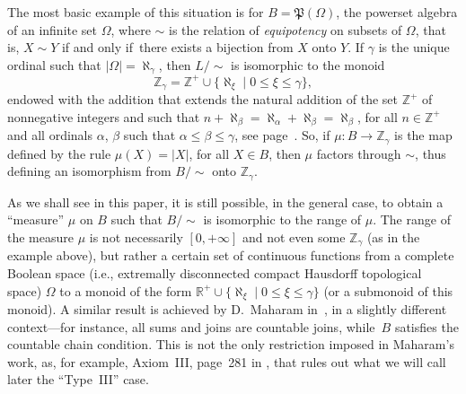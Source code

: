 \documentclass[psamsfonts,reqno]{memo-l}
\theoremstyle{plain}
\theoremstyle{definition}
\theoremstyle{remark}
\numberwithin{equation}{section}
\renewcommand{\iff}{if and only if}
\newcommand{\ZZ}{\mathbb{Z}}
\newcommand{\RR}{\mathbb{R}}
\newcommand{\set}[1]{\{#1\}}
\newcommand{\setm}[2]{\set{#1\mid#2}}
\begin{document}
The most basic example of this situation is for
$B=\mathfrak{P}(\Omega)$, the powerset algebra of an infinite set $\Omega$,
where $\sim$ is the relation of \emph{equipotency}
on subsets of $\Omega$, that is, $X\sim Y$ \iff\ there exists a bijection
from $X$ onto $Y$. If $\gamma$ is the unique ordinal such that
$|\Omega|=\aleph_\gamma$, then $L/{\sim}$ is isomorphic to the monoid
\index{Zzzgamma@$\ZZ_\gamma$}
   \[
   \ZZ_\gamma=\ZZ^+\cup\setm{\aleph_\xi}{0\leq\xi\leq\gamma},
   \]
endowed with the addition that extends the natural addition of the set
$\ZZ^+$ of nonnegative integers and such that
$n+\aleph_\beta=\aleph_\alpha+\aleph_\beta=\aleph_\beta$, for all $n\in\ZZ^+$
and all ordinals $\alpha$, $\beta$ such that $\alpha\leq\beta\leq\gamma$, see
page~\pageref{Pg:ZR2gam}. So, if $\mu\colon B\to\ZZ_\gamma$ is the map
defined by the rule $\mu(X)=|X|$, for all $X\in B$, then $\mu$ factors
through $\sim$, thus defining an isomorphism from $B/{\sim}$ onto
$\ZZ_\gamma$.

As we shall see in this paper, it is still possible, in the general case, to
obtain a ``measure'' $\mu$ on $B$ such that $B/{\sim}$ is isomorphic to the
range of $\mu$. The range of the measure $\mu$ is not necessarily
$[0,+\infty]$ and not even some $\ZZ_\gamma$ (as in the example above), but
rather a certain set of continuous functions from a complete Boolean space
(i.e., extremally disconnected compact Hausdorff topological space)
$\Omega$ to a monoid of the form
$\RR^+\cup\setm{\aleph_\xi}{0\leq\xi\leq\gamma}$ (or a submonoid of this
monoid). A similar result is achieved by D.~Maharam
in~\cite{Maha49}, in a slightly different context---for
instance, all sums and joins are countable joins, while~$B$ satisfies the
countable chain condition. This is not the only restriction imposed in
Maharam's work, as, for example, Axiom~III, page~281 in
\cite{Maha49}, that rules out what we will call later the
``Type~III'' case.
\end{document}
